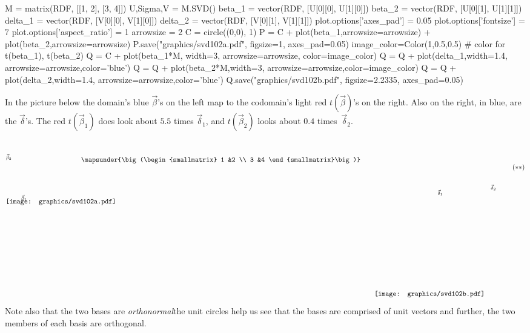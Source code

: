 \begin{sagesilent}
M = matrix(RDF, [[1, 2], [3, 4]])
U,Sigma,V = M.SVD()
beta_1 = vector(RDF, [U[0][0], U[1][0]])
beta_2 = vector(RDF, [U[0][1], U[1][1]])
delta_1 = vector(RDF, [V[0][0], V[1][0]])
delta_2 = vector(RDF, [V[0][1], V[1][1]])
plot.options['axes_pad'] = 0.05
plot.options['fontsize'] = 7
plot.options['aspect_ratio'] = 1
arrowsize = 2
C = circle((0,0), 1)
P = C + plot(beta_1,arrowsize=arrowsize) + plot(beta_2,arrowsize=arrowsize)
P.save("graphics/svd102a.pdf", figsize=1, axes_pad=0.05)
image_color=Color(1,0.5,0.5)   # color for t(beta_1), t(beta_2)
Q = C + plot(beta_1*M, width=3, arrowsize=arrowsize, color=image_color) 
Q = Q + plot(delta_1,width=1.4, arrowsize=arrowsize,color='blue') 
Q = Q + plot(beta_2*M,width=3, arrowsize=arrowsize,color=image_color) 
Q = Q + plot(delta_2,width=1.4, arrowsize=arrowsize,color='blue')
Q.save("graphics/svd102b.pdf", figsize=2.2335, axes_pad=0.05)
\end{sagesilent}
In the picture below the domain's 
blue $\vec{\beta}$'s on the left map to the codomain's light red 
$t(\vec{\beta})$'s on the right.
Also on the right, in blue, are the $\vec{\delta}$'s.
The red $t(\vec{\beta}_1)$ does look about $5.5$ times $\vec{\delta}_1$,
and $t(\vec{\beta}_2)$ looks about $0.4$ times~$\vec{\delta}_2$. 
\begin{equation*}
  \setlength{\unitlength}{1in}
  \begin{picture}(1.35,1.35)
    \put(0,1.825){\texttt{[image: graphics/svd102a.pdf]}}
    \put(.3,1.9){\scriptsize $\vec{\beta}_1$}
    \put(0,2.7){\scriptsize $\vec{\beta}_2$}
  \end{picture}
  \quad
  \raisebox{2.65in}{$\mapsunder{\big (\begin{smallmatrix} 1 &2 \\ 3 &4 \end{smallmatrix}\big )}$}
  \qquad
  \begin{picture}(2.45,3.15)
    \put(0,0){\texttt{[image: graphics/svd102b.pdf]}}
    \put(1.25,2){\scriptsize $\vec{\delta}_1$}
    \put(2.3,2.1){\scriptsize $\vec{\delta}_2$}
  \end{picture}
  \tag*{\raisebox{2.5in}{($**$)}}
\end{equation*}
Note also that the two bases are \textit{orthonormal}\Dash the unit circles help
us see that the bases are comprised of unit vectors and further,
the two members of each basis are orthogonal.


